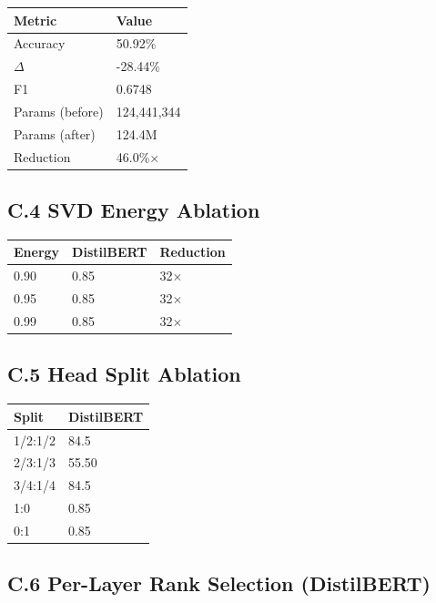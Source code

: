 \begin{table}[H]
\centering
\small
\begin{tabular}{ll}
\toprule
\textbf{Metric} & \textbf{Value} \\
\midrule
Accuracy & 50.92\% \\
$\Delta$ & -28.44\% \\
F1 & 0.6748 \\
Params (before) & 124,441,344 \\
Params (after) & 124.4M \\
Reduction & 46.0\%$\times$ \\
\bottomrule
\end{tabular}
\end{table}

\subsection{C.4 SVD Energy Ablation}

\begin{table}[H]
\centering
\small
\begin{tabular}{lll}
\toprule
\textbf{Energy} & \textbf{DistilBERT} & \textbf{Reduction} \\
\midrule
0.90 & 0.85 & 32$\times$ \\
0.95 & 0.85 & 32$\times$ \\
0.99 & 0.85 & 32$\times$ \\
\bottomrule
\end{tabular}
\end{table}

\subsection{C.5 Head Split Ablation}

\begin{table}[H]
\centering
\small
\begin{tabular}{ll}
\toprule
\textbf{Split} & \textbf{DistilBERT} \\
\midrule
1/2:1/2 & 84.5 \\
2/3:1/3 & 55.50 \\
3/4:1/4 & 84.5 \\
1:0 & 0.85 \\
0:1 & 0.85 \\
\bottomrule
\end{tabular}
\end{table}

\subsection{C.6 Per-Layer Rank Selection (DistilBERT)}

